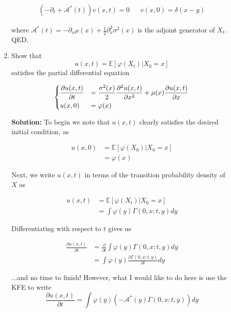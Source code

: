 \documentclass[12pt, a4paper]{article}
\begin{document}
\begin{enumerate}
\begin{enumerate}
        \begin{align*}
            (-\partial_t + \mathcal A^*(t)) v(x,t) = 0 && v(x,0) = \delta(x-y)
        \end{align*}

        where $\mathcal A^*(t) = -\partial_x \mu(x) + \frac{1}{2} \partial_x^2 \sigma^2(x)$ is the adjoint generator of $X_t$. QED. 

        \item Show that $$u(x,t) = \mathbb E \left[ \varphi(X_t) \Big| X_0=x \right]$$
        satisfies the partial differential equation 

        \begin{align*}
            \begin{dcases}
                \frac{\partial u(x,t)}{\partial t} &= \frac{\sigma^2(x)}{2} \frac{\partial^2 u(x,t)}{\partial x^2} +\mu(x)\frac{\partial u(x,t)}{\partial x} \\
            u(x,0) &= \varphi(x)
            \end{dcases}
        \end{align*}

        \textbf{Solution:} To begin we note that $u(x,t)$ clearly satisfies the desired initial condition, as 

        \begin{align*}
            u(x,0) &= \mathbb E \left[ \varphi(X_0) \Big| X_0=x \right]\\
            &= \varphi(x)
        \end{align*}
        
        
        Next, we write $u(x,t)$ in terms of the transition probability density of $X$ as

        \begin{align*}
            u(x,t) &= \mathbb E \left[ \varphi(X_t) \Big| X_0=x \right]\\
            &= \int \varphi(y) \Gamma(0,x;t,y) dy
        \end{align*}

        Differentiating with respect to $t$ gives us 

        \begin{align*}
            \frac{\partial u(x,t)}{\partial t} &= \frac{\partial}{\partial t} \int \varphi(y) \Gamma(0,x;t,y) dy \\
            &= \int \varphi(y) \frac{\partial \Gamma(0,x;t,y)}{\partial t} dy
        \end{align*}

        ...and no time to finish! However, what I would like to do here is use the KFE to write $$\frac{\partial u(x, t)}{\partial t} = \int \varphi(y) (-\mathcal{A}^*(y) \Gamma(0, x; t, y)) dy$$


\end{enumerate}
\end{enumerate}
\end{document}
